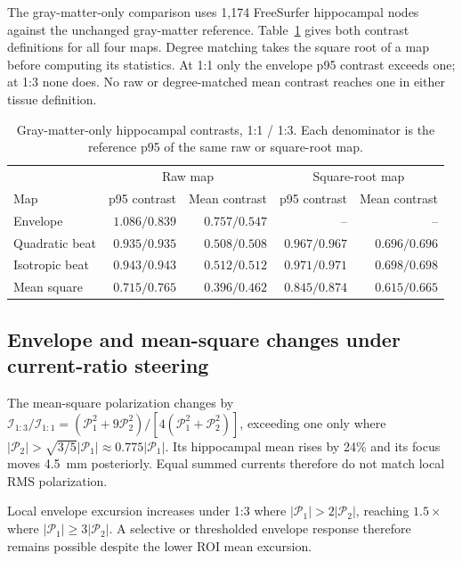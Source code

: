 \documentclass[11pt,a4paper]{article}
\providecommand{\DIFaddtex}[1]{{\protect\color{blue} \sf #1}} %
\providecommand{\DIFadd}[1]{\texorpdfstring{\DIFaddtex{#1}}{#1}} %
\begin{document}
\DIFadd{The gray-matter-only comparison uses 1,174 FreeSurfer hippocampal nodes
against the unchanged gray-matter reference. Table~\ref{tab:fem-gm-contrasts}
gives both contrast definitions for all four maps. Degree matching takes
the square root of a map before computing its statistics. At 1:1 only the
envelope p95 contrast exceeds one; at 1:3 none does. No raw or degree-matched
mean contrast reaches one in either tissue definition.
}

\begin{table}[htbp]
\color{blue}\centering\small
\caption{\color{blue}Gray-matter-only hippocampal contrasts, 1:1 / 1:3. Each denominator
is the reference p95 of the same raw or square-root map.}
\label{tab:fem-gm-contrasts}
\setlength{\tabcolsep}{4pt}
\begin{tabular}{@{}lrrrr@{}}
\toprule
& \multicolumn{2}{c}{Raw map} & \multicolumn{2}{c}{Square-root map}\\
Map & p95 contrast & Mean contrast & p95 contrast & Mean contrast\\
\midrule
Envelope & $1.086/0.839$ & $0.757/0.547$ & -- & --\\
Quadratic beat & $0.935/0.935$ & $0.508/0.508$ & $0.967/0.967$ & $0.696/0.696$\\
Isotropic beat & $0.943/0.943$ & $0.512/0.512$ & $0.971/0.971$ & $0.698/0.698$\\
Mean square & $0.715/0.765$ & $0.396/0.462$ & $0.845/0.874$ & $0.615/0.665$\\
\bottomrule
\end{tabular}
\end{table}

\subsection{\DIFadd{Envelope and mean-square changes under current-ratio steering}}\label{supp:steering-algebra}
\DIFadd{The mean-square polarization
changes by $\mathcal I_{1:3}/\mathcal I_{1:1}
=(\mathcal P_1^2+9\mathcal P_2^2)/[4(\mathcal P_1^2+\mathcal P_2^2)]$,
exceeding one only where $|\mathcal P_2|>\sqrt{3/5}|\mathcal P_1|
\approx0.775|\mathcal P_1|$. Its hippocampal mean rises by 24\% and its focus
moves 4.5~mm posteriorly. Equal summed currents therefore do not match local
RMS polarization.
}

\DIFadd{Local envelope excursion increases under 1:3 where
$|\mathcal P_1|>2|\mathcal P_2|$, reaching $1.5\times$ where
$|\mathcal P_1|\geq3|\mathcal P_2|$. A selective or thresholded envelope
response therefore remains possible despite the lower ROI mean excursion.
}
\end{document}

